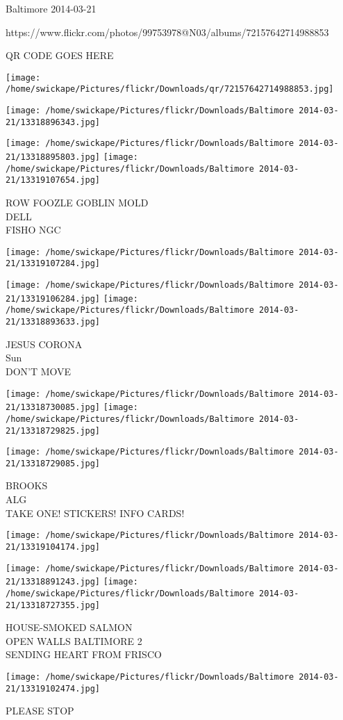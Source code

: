 \documentclass[10pt,letterpaper]{article}
\begin{document}
Baltimore 2014-03-21

https://www.flickr.com/photos/99753978@N03/albums/72157642714988853

QR CODE GOES HERE

\texttt{[image: /home/swickape/Pictures/flickr/Downloads/qr/72157642714988853.jpg]}
\pagebreak

\texttt{[image: /home/swickape/Pictures/flickr/Downloads/Baltimore 2014-03-21/13318896343.jpg]}

\vspace{0.25in}
\texttt{[image: /home/swickape/Pictures/flickr/Downloads/Baltimore 2014-03-21/13318895803.jpg]}
\texttt{[image: /home/swickape/Pictures/flickr/Downloads/Baltimore 2014-03-21/13319107654.jpg]}

ROW FOOZLE GOBLIN MOLD\\
DELL\\
FISHO NGC\\
\pagebreak

\texttt{[image: /home/swickape/Pictures/flickr/Downloads/Baltimore 2014-03-21/13319107284.jpg]}

\vspace{0.25in}
\texttt{[image: /home/swickape/Pictures/flickr/Downloads/Baltimore 2014-03-21/13319106284.jpg]}
\texttt{[image: /home/swickape/Pictures/flickr/Downloads/Baltimore 2014-03-21/13318893633.jpg]}

JESUS CORONA\\
Sun\\
DON'T MOVE\\
\pagebreak

\texttt{[image: /home/swickape/Pictures/flickr/Downloads/Baltimore 2014-03-21/13318730085.jpg]}
\texttt{[image: /home/swickape/Pictures/flickr/Downloads/Baltimore 2014-03-21/13318729825.jpg]}

\texttt{[image: /home/swickape/Pictures/flickr/Downloads/Baltimore 2014-03-21/13318729085.jpg]}

BROOKS\\
ALG\\
TAKE ONE!  STICKERS!  INFO CARDS!\\
\pagebreak

\texttt{[image: /home/swickape/Pictures/flickr/Downloads/Baltimore 2014-03-21/13319104174.jpg]}

\vspace{0.25in}
\texttt{[image: /home/swickape/Pictures/flickr/Downloads/Baltimore 2014-03-21/13318891243.jpg]}
\texttt{[image: /home/swickape/Pictures/flickr/Downloads/Baltimore 2014-03-21/13318727355.jpg]}

HOUSE{-}SMOKED SALMON\\
OPEN WALLS BALTIMORE 2\\
SENDING HEART FROM FRISCO\\
\pagebreak

\texttt{[image: /home/swickape/Pictures/flickr/Downloads/Baltimore 2014-03-21/13319102474.jpg]}

PLEASE STOP\\
\pagebreak
\end{document}
